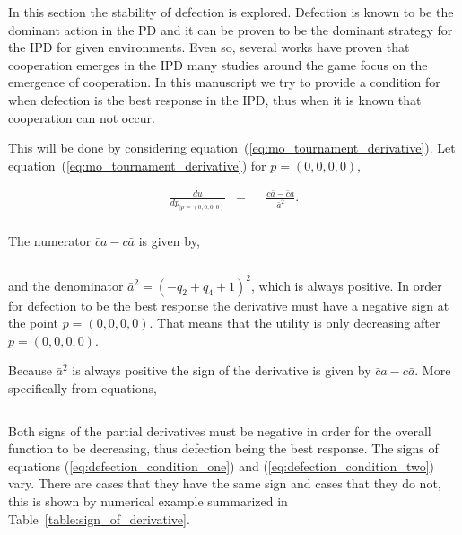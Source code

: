 \documentclass[10pt]{article}
\begin{document}
In this section the stability of defection is explored. Defection is
known to be the dominant action in the PD and it can be proven to be the dominant
strategy for the IPD for given environments. Even so, several works have proven
that cooperation emerges in the IPD many studies around the game focus on the
emergence of cooperation. In this manuscript we try to provide a condition for when
defection is the best response in the IPD, thus when it is known that cooperation can
not occur.

This will be done by considering equation~(\ref{eq:mo_tournament_derivative}).
Let equation~(\ref{eq:mo_tournament_derivative}) for \(p = (0, 0, 0, 0)\),

\begin{equation}\label{eq:derivative_of_quadratic_zero}
    \begin{aligned}
     \frac{du}{dp_{| p=(0, 0, 0, 0)}} & = && \frac{c \bar{a} - \bar{c}a}
      {\bar{a}^2} .\\
    \end{aligned}
\end{equation}

The numerator \(\bar{c}a - c\bar{a}\) is given by,

\[\]

and the denominator \(\bar{a} ^ 2 = (-q_2 + q_4 + 1) ^ 2\), which is always positive. In order
for defection to be the best response the derivative must have a negative
sign at the point \(p = (0, 0, 0, 0)\). That means that the utility is only
decreasing after \(p = (0, 0, 0, 0)\).

Because \(\bar{a} ^ 2\) is always positive the sign of the derivative is given by \(\bar{c}a - c\bar{a}\).
More specifically from equations,

\begin{equation}\label{eq:defection_condition_one}
    
\end{equation}
\begin{equation}\label{eq:defection_condition_two}
    
\end{equation}

Both signs of the partial derivatives must be negative in order for the overall
function to be decreasing, thus defection being the best response.
The signs of equations (\ref{eq:defection_condition_one}) and (\ref{eq:defection_condition_two})
vary. There are cases that they have the same sign and cases that they do not,
this is shown by numerical example summarized in Table~\ref{table:sign_of_derivative}.
\end{document}
